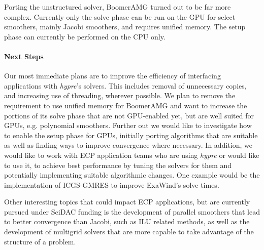 Porting the unstructured solver, BoomerAMG turned out to be far more complex. Currently only the solve phase can be run on the GPU for select smoothers, mainly Jacobi smoothers, and requires unified memory. The setup phase can currently be performed on the CPU only.


\paragraph{Next Steps}

Our most immediate plans are to improve the efficiency of interfacing applications with {\sl hypre}'s solvers. This includes removal of unnecessary copies, and increasing use of threading, wherever possible. We plan to remove the requirement to use unified memory for BoomerAMG and want to increase the portions of its solve phase that are not GPU-enabled yet, but are well suited for GPUs, e.g. polynomial smoothers. Further out we would like to investigate how to enable the setup phase for GPUs, initially porting algorithms that are suitable as well as finding ways to improve convergence where necessary.
In addition, we would like to work with ECP application teams who are using {\sl hypre} or would like to use it, to achieve best performance by tuning the solvers for them and potentially implementing suitable algorithmic changes. One example would be the implementation of ICGS-GMRES to improve ExaWind's solve times.

Other interesting topics that could impact ECP applications, but are currently pursued under SciDAC funding is the development of parallel smoothers that lead to better convergence than Jacobi, such as ILU related methods, as well as the development of multigrid solvers that are more capable to take advantage of the structure of a problem.

